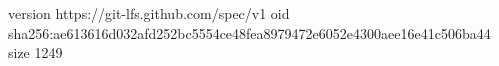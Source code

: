 version https://git-lfs.github.com/spec/v1
oid sha256:ae613616d032afd252bc5554ce48fea8979472e6052e4300aee16e41c506ba44
size 1249
